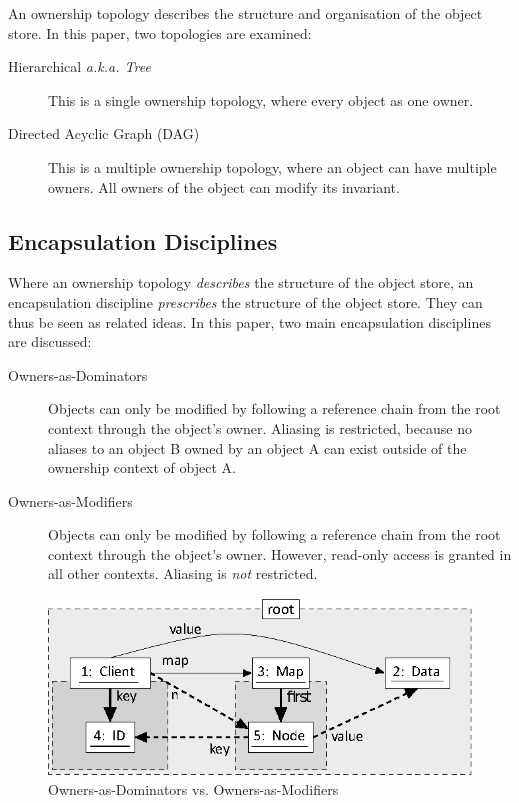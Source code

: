 \documentclass{acm_proc_article-sp}
\begin{document}
An ownership topology describes the structure and organisation of the
object store. In this paper, two topologies are examined:

\begin{description}
	\item[Hierarchical \emph{a.k.a. Tree}] This is a single ownership topology,
		\linebreak where every object as one owner.
	\item[Directed Acyclic Graph (DAG)] This is a multiple ownership \linebreak
		topology, where an object can have multiple owners. All owners of the
		object can modify its invariant.
\end{description}

\subsection{Encapsulation Disciplines}
\label{subsec:encapsulation}

Where an ownership topology \emph{describes} the structure of the object store,
an encapsulation discipline \emph{prescribes} the structure of the object
store. They can thus be seen as related ideas. In this paper, two main
encapsulation disciplines are discussed:

\begin{description}
	\item[Owners-as-Dominators] Objects can only be modified by following a
		reference chain from the root context through the object's owner.
		Aliasing is restricted, because no aliases to an object B owned by an
		object A can exist outside of the ownership context of object A.
	\item[Owners-as-Modifiers] Objects can only be modified by following a
		reference chain from the root context through the object's owner.
		However, read-only access is granted in all other contexts. Aliasing is
		\emph{not} restricted.
\end{description}

\begin{figure}[t]
	\centering
	\includegraphics{ownership-dominator-vs-modifier.eps}
	\caption{Owners-as-Dominators vs. Owners-as-Modifiers}
	\label{fig:ownership-dominator-vs-modifier}
\end{figure}
\end{document}
